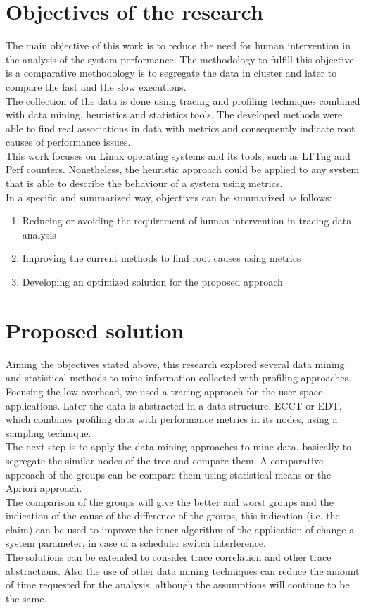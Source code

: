\section{Objectives of the research}  %
The main objective of this work is to reduce the need for human intervention in the analysis of the system performance. The methodology to fulfill this objective is a comparative methodology is to segregate the data in cluster and later to compare the fast and the slow executions.\\
The collection of the data is done using tracing and profiling techniques combined with data mining, heuristics and statistics tools. The developed methods were able to find real associations in data with metrics and consequently indicate root causes of performance issues.\\
This work focuses on Linux operating systems and its tools, such as LTTng and Perf counters. Nonetheless, the heuristic approach could be applied to any system that is able to describe the behaviour of a system using metrics.\\
In a specific and summarized way, objectives can be summarized as follows:\\
\begin{enumerate}
\item Reducing or avoiding the requirement of human intervention in tracing data analysis
\item Improving the current methods to find root causes using metrics
\item Developing an optimized solution for the proposed approach
\end{enumerate}
\section{Proposed solution}  %
Aiming the objectives stated above, this research explored several data mining and statistical methods to mine information collected with profiling approaches. Focusing the low-overhead, we used a tracing approach for the user-space applications. Later the data is abstracted in a data structure, ECCT or EDT, which combines profiling data with performance metrics in its nodes, using a sampling technique.\\
The next step is to apply the data mining approaches to mine data, basically to segregate the similar nodes of the tree and compare them. A comparative approach of the groups can be compare them using statistical means or the Apriori approach.\\
The comparison of the groups will give the better and worst groups and the indication of the cause of the difference of the groups, this indication (i.e. the claim) can be used to improve the inner algorithm of the application of change a system parameter, in case of a scheduler switch interference.\\
The solutions can be extended to consider trace correlation and other trace abstractions. Also the use of other data mining techniques can reduce the amount of time requested for the analysis, although the assumptions will continue to be the same.
